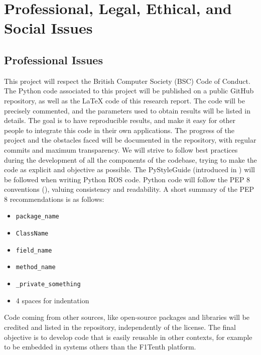 
\chapter{Professional, Legal, Ethical, and Social Issues} %

\label{Chapter4} %



\section{Professional Issues}
\label{proiss}
This project will respect the British Computer Society (BSC) Code of Conduct. \newline
The Python code associated to this project will be published on a public GitHub repository, as well as the \LaTeX $ $ code of this research report. The code will be precisely commented, and the parameters used to obtain results will be listed in details. The goal is to have reproducible results, and make it easy for other people to integrate this code in their own applications.
\newline
The progress of the project and the obstacles faced will be documented in the repository, with regular commits and maximum transparency. We will strive to follow best practices during the development of all the components of the codebase, trying to make the code as explicit and objective as possible. The PyStyleGuide (introduced in \cite{rossyntax}) will be followed when writing Python ROS code. Python code will follow the PEP 8 conventions (\cite{pysyntax}), valuing consistency and readability. A short summary of the PEP 8 recommendations is as follows:
\begin{itemize}
	\item \verb |package_name|
	\item \verb |ClassName|
	\item \verb |field_name|
	\item \verb |method_name|
	\item \verb |_private_something|
	\item 4 spaces for indentation
\end{itemize}

Code coming from other sources, like open-source packages and libraries will be credited and listed in the repository, independently of the license.
\newline
The final objective is to develop code that is easily reusable in other contexts, for example to be embedded in systems others than the F1Tenth platform.
